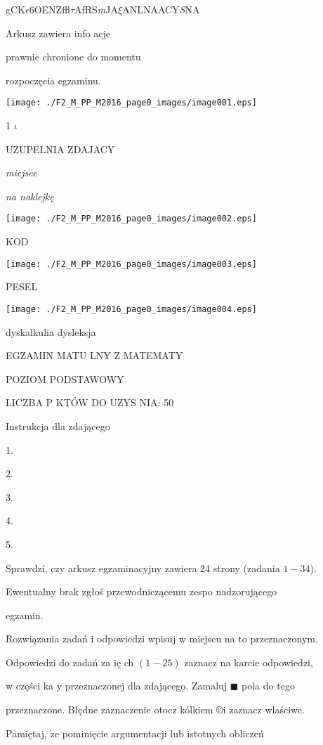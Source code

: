 \documentclass[a4paper,12pt]{article}
\begin{document}
gCK$\epsilon$6OENZffl$\tau$AfRS{\it m}JA$\xi$ANLNAACY{\it S}NA

Arkusz zawiera info acje

prawnie chronione do momentu

rozpoczęcia egzaminu.
\begin{center}
\texttt{[image: ./F2\_M\_PP\_M2016\_page0\_images/image001.eps]}
\end{center}
1  $\iota$

UZUPELNIA ZDAJACY

{\it miejsce}

{\it na naklejkę}
\begin{center}
\texttt{[image: ./F2\_M\_PP\_M2016\_page0\_images/image002.eps]}
\end{center}
KOD
\begin{center}
\texttt{[image: ./F2\_M\_PP\_M2016\_page0\_images/image003.eps]}
\end{center}
PESEL
\begin{center}
\texttt{[image: ./F2\_M\_PP\_M2016\_page0\_images/image004.eps]}
\end{center}
dyskalkulia  dysleksja

EGZAMIN MATU  LNY Z MATEMATY

POZIOM PODSTAWOWY

LICZBA P  KTÓW DO UZYS NIA: 50

Instrukcja dla zdającego

1.

2.

3.

4.

5.

Sprawdzí, czy arkusz egzaminacyjny zawiera 24 strony (zadania $1-34$).

Ewentualny brak zgłoś przewodniczącemu zespo nadzorującego

egzamin.

Rozwiązania zadań i odpowiedzi wpisuj w miejscu na to przeznaczonym.

Odpowiedzi do zadań za ię ch $(1-25)$ zaznacz na karcie odpowiedzi,

w części ka $\mathrm{y}$ przeznaczonej dla zdającego. Zamaluj $\blacksquare$ pola do tego

przeznaczone. Błędne zaznaczenie otocz kólkiem \copyright i zaznacz wlaściwe.

Pamiętaj, $\dot{\mathrm{z}}\mathrm{e}$ pominięcie argumentacji lub istotnych obliczeń
\end{document}
